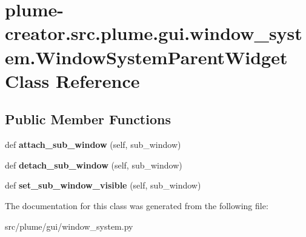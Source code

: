\hypertarget{classplume-creator_1_1src_1_1plume_1_1gui_1_1window__system_1_1_window_system_parent_widget}{}\section{plume-\/creator.src.\+plume.\+gui.\+window\+\_\+system.\+Window\+System\+Parent\+Widget Class Reference}
\label{classplume-creator_1_1src_1_1plume_1_1gui_1_1window__system_1_1_window_system_parent_widget}
\subsection*{Public Member Functions}
\begin{DoxyCompactItemize}
\item 
def {\bfseries attach\+\_\+sub\+\_\+window} (self, sub\+\_\+window)\hypertarget{classplume-creator_1_1src_1_1plume_1_1gui_1_1window__system_1_1_window_system_parent_widget_a1942184e1ba903f8b37684c591db0509}{}\label{classplume-creator_1_1src_1_1plume_1_1gui_1_1window__system_1_1_window_system_parent_widget_a1942184e1ba903f8b37684c591db0509}

\item 
def {\bfseries detach\+\_\+sub\+\_\+window} (self, sub\+\_\+window)\hypertarget{classplume-creator_1_1src_1_1plume_1_1gui_1_1window__system_1_1_window_system_parent_widget_a3901ed7f412bdbb353eb455076b33979}{}\label{classplume-creator_1_1src_1_1plume_1_1gui_1_1window__system_1_1_window_system_parent_widget_a3901ed7f412bdbb353eb455076b33979}

\item 
def {\bfseries set\+\_\+sub\+\_\+window\+\_\+visible} (self, sub\+\_\+window)\hypertarget{classplume-creator_1_1src_1_1plume_1_1gui_1_1window__system_1_1_window_system_parent_widget_a162ff815daf5188d80a44926f630bfd5}{}\label{classplume-creator_1_1src_1_1plume_1_1gui_1_1window__system_1_1_window_system_parent_widget_a162ff815daf5188d80a44926f630bfd5}

\end{DoxyCompactItemize}


The documentation for this class was generated from the following file\+:\begin{DoxyCompactItemize}
\item 
src/plume/gui/window\+\_\+system.\+py\end{DoxyCompactItemize}
